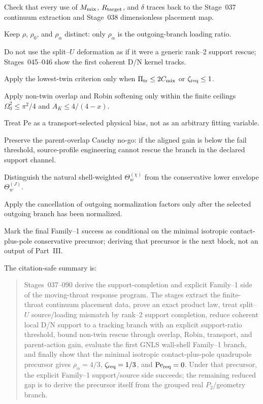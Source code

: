 \begin{verificationchecklist}
\item Check that every use of \(M_{\rm mix}\), \(R_{\rm target}\), and \(\delta\) traces back to the Stage~037 continuum extraction and Stage~038 dimensionless placement map.
\item Keep \(\rho\), \(\rho_0\), and \(\rho_\alpha\) distinct: only \(\rho_\alpha\) is the outgoing-branch loading ratio.
\item Do not use the split--\(U\) deformation as if it were a generic rank--2 support rescue; Stages~045--046 show the first coherent D/N kernel tracks.
\item Apply the lowest-twin criterion only when \(\Pi_{\rm tr}\leq2C_{\rm mix}\) or \(\zeta_{\rm req}\leq1\).
\item Apply non-twin overlap and Robin softening only within the finite ceilings \(\Omega_0^2\leq\pi^2/4\) and \(A_K\leq4/(4-x)\).
\item Treat \(\mathrm{Pe}\) as a transport-selected physical bias, not as an arbitrary fitting variable.
\item Preserve the parent-overlap Cauchy no-go: if the aligned gain is below the fail threshold, source-profile engineering cannot rescue the branch in the declared support channel.
\item Distinguish the natural shell-weighted \(\Theta_w^{(\chi)}\) from the conservative lower envelope \(\Theta_w^{(J)}\).
\item Apply the cancellation of outgoing normalization factors only after the selected outgoing branch has been normalized.
\item Mark the final Family--1 success as conditional on the minimal isotropic contact-plus-pole conservative precursor; deriving that precursor is the next block, not an output of Part~III.
\end{verificationchecklist}

The citation-safe summary is:
\begin{quote}
Stages~037--090 derive the support-completion and explicit Family--1 side of the moving-throat response program.  The stages extract the finite-throat continuum placement data, prove an exact product law, treat split--\(U\) source/loading mismatch by rank--2 support completion, reduce coherent local D/N support to a tracking branch with an explicit support-ratio threshold, bound non-twin rescue through overlap, Robin, transport, and parent-action gain, evaluate the first GNLS wall-shell Family--1 branch, and finally show that the minimal isotropic contact-plus-pole quadrupole precursor gives \(\rho_\alpha=4/3\), \(\zeta_{\rm req}=1/3\), and \(\mathrm{Pe}_{\rm req}=0\).  Under that precursor, the explicit Family--1 support/source side succeeds; the remaining reduced gap is to derive the precursor itself from the grouped real \(P_2\)/geometry branch.
\end{quote}
